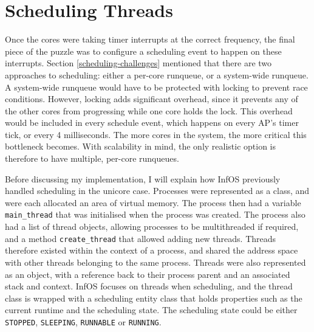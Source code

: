 \documentclass[bsc,frontabs,singlespacing,parskip,deptreport]{infthesis}
\begin{document}

\section{Scheduling Threads} \label{scheduling-threads}
Once the cores were taking timer interrupts at the correct frequency, the final piece of the puzzle was to configure a scheduling event to happen on these interrupts. Section \ref{scheduling-challenges} mentioned that there are two approaches to scheduling: either a per-core runqueue, or a system-wide runqueue. A system-wide runqueue would have to be protected with locking to prevent race conditions. However, locking adds significant overhead, since it prevents any of the other cores from progressing while one core holds the lock. This overhead would be included in every schedule event, which happens on every AP's timer tick, or every 4 milliseconds. The more cores in the system, the more critical this bottleneck becomes. With scalability in mind, the only realistic option is therefore to have multiple, per-core runqueues.

Before discussing my implementation, I will explain how InfOS previously handled scheduling in the unicore case. Processes were represented as a class, and were each allocated an area of virtual memory. The process then had a variable \verb|main_thread| that was initialised when the process was created. The process also had a list of thread objects, allowing processes to be multithreaded if required, and a method \verb|create_thread| that allowed adding new threads. Threads therefore existed within the context of a process, and shared the address space with other threads belonging to the same process. Threads were also represented as an object, with a reference back to their process parent and an associated stack and context. InfOS focuses on threads when scheduling, and the thread class is wrapped with a scheduling entity class that holds properties such as the current runtime and the scheduling state. The scheduling state could be either \verb|STOPPED|, \verb|SLEEPING|, \verb|RUNNABLE| or \verb|RUNNING|.
\end{document}
